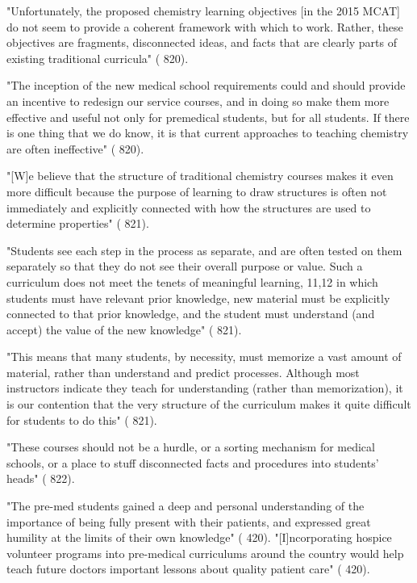 "Unfortunately, the proposed chemistry learning objectives [in the 2015 MCAT] do not seem to provide a coherent framework with which to work. Rather, these objectives are fragments, disconnected ideas, and facts that are clearly parts of existing traditional curricula" (\cite{Cooper-2013} 820).

"The inception of the new medical school requirements could and should provide an incentive to redesign our service courses, and in doing so make them more effective and usefulnot only for premedical students, but for all students. If there is one thing that we do know, it is that current approaches to teaching chemistry are often ineffective" (\cite{Cooper-2013} 820).

"[W]e believe that the structure of traditional chemistry courses makes it even more difficult because the purpose of learning to draw structures is often not immediately and explicitly connected with how the structures are used to determine properties" (\cite{Cooper-2013} 821).

"Students see each step in the process as separate, and are often tested on them separately so that they do not see their overall purpose or value. Such a curriculum does not meet the tenets of meaningful learning, 11,12 in which students must have relevant prior knowledge, new material must be explicitly connected to that prior knowledge, and the student must understand (and accept) the value of the new knowledge" (\cite{Cooper-2013} 821).

"This means that many students, by necessity, must memorize a vast amount of material, rather than understand and predict processes. Although most instructors indicate they teach for understanding (rather than memorization), it is our contention that the very structure of the curriculum makes it quite difficult for students to do this" (\cite{Cooper-2013} 821).

"These courses should not be a hurdle, or a sorting mechanism for medical schools, or a place to stuff disconnected facts and procedures into students’ heads" (\cite{Cooper-2013} 822).


"The pre-med students gained a deep and
personal understanding of the importance of being fully present with their patients, and expressed great humility at the limits of their own knowledge" (\cite{Doering-2015} 420).
"[I]ncorporating hospice volunteer programs into pre-medical curriculums around the country would help teach future doctors important lessons about quality patient care" (\cite{Doering-2015} 420).


